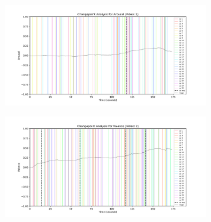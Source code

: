 \documentclass[11pt, letterpaper]{article}
\begin{document}
\begin{figure}
    \centering
    \begin{subfigure}[t]{0.49\textwidth}
        \centering
        \includegraphics[width=\linewidth]{changepoints_V2_arousal_avg} 
        \caption{} \label{fig:changepoints_V2_arousal_avg}
    \end{subfigure}
    \hfill
    \begin{subfigure}[t]{0.49\textwidth}
        \centering
        \includegraphics[width=\linewidth]{changepoints_V2_valence_avg} 
        \caption{} \label{fig:changepoints_V2_valence_avg}
    \end{subfigure}
    

\end{figure}
\end{document}
